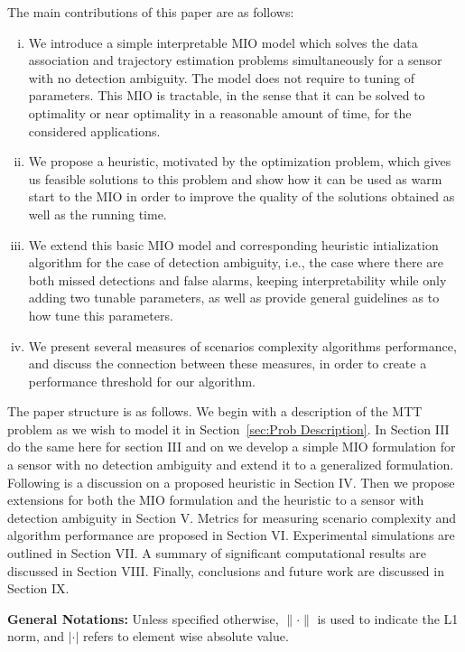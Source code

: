 \documentclass[journal]{IEEEtran}
\begin{document}
{\color{red} 
The main contributions of this paper are as follows: 
\begin{enumerate}[(i)]
\item We introduce a simple interpretable MIO model which solves the data association and trajectory estimation problems simultaneously for a sensor with no detection ambiguity. The model does not require to tuning of parameters. This MIO is tractable, in the sense that it can be solved to optimality or near optimality in a reasonable amount of time, for the considered applications.
\item We propose a heuristic, motivated by the optimization problem, which gives us feasible solutions to this problem and show how it can be used as warm start to the MIO in order to improve the quality of the solutions obtained as well as the running time. 
\item We extend this basic MIO model and corresponding heuristic intialization algorithm for the case of detection ambiguity, i.e., the case where there are both missed detections and false alarms, keeping interpretability while only adding two tunable parameters, as well as provide general guidelines as to how tune this parameters. 
\item  We present several measures of scenarios complexity algorithms performance, and discuss the connection between these measures, in order to create a performance threshold for our algorithm. 
\end{enumerate}}

The paper structure is as follows. We begin with a description of the MTT problem as we wish to model it in Section~\ref{sec:Prob Description}. In Section III {\color{red} do the same here for section III and on } we develop a simple MIO formulation for a sensor with no detection ambiguity and extend it to a generalized formulation. Following is a discussion on a proposed heuristic in Section IV. Then we propose extensions for both the MIO formulation and the heuristic to a sensor with detection ambiguity in Section V. Metrics for measuring scenario complexity and algorithm performance are proposed in Section VI. Experimental simulations are outlined in Section VII. A summary of significant computational results are discussed in Section VIII. Finally, conclusions and future work are discussed in Section IX.

{\bf General Notations:}
Unless specified otherwise, $\|\cdot\|$ is used to indicate the L1 norm, and $|\cdot|$ refers to element wise absolute value.
\end{document}

